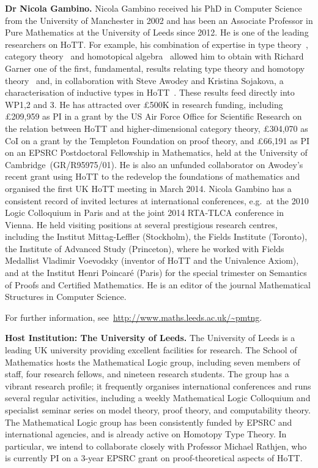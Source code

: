 \documentclass[a4paper,11pt]{article}
\begin{document}
\textbf{Dr Nicola Gambino.} Nicola Gambino received his PhD in
Computer Science from the University of Manchester in 2002 and has
been an Associate Professor in Pure Mathematics at the
University of Leeds since 2012.
He is one of the leading researchers
on HoTT. For example, his combination of expertise in type
theory~\cite{GambinoN:gentti}, category theory~\cite{GambinoN:polfpm}
and homotopical algebra~\cite{GambinoN:homl2c,GambinoN:weilsh} allowed
him to obtain with Richard Garner one of the 
first, fundamental, results relating type theory and homotopy
theory~\cite{GambinoN:idetwfs} and, in collaboration with Steve Awodey
and Kristina Sojakova, a characterisation of inductive types in
HoTT~\cite{awodeyGamSoja:indTypesInHTT}. These results feed directly
into WP1,2 and 3. He has attracted over \pounds500K in research
funding, including \pounds 209,959 as PI in a grant by the US Air
Force Office for Scientific Research on the relation between HoTT and
higher-dimensional category theory, \pounds 304,070 as CoI on a grant
by the Templeton Foundation on proof theory, and \pounds 66,191 as PI
on an EPSRC Postdoctoral Fellowship in Mathematics, held at the
University of Cambridge~(GR/R95975/01). He is also an unfunded
collaborator on Awodey's recent grant using HoTT to the
redevelop the foundations of mathematics and organised the first
UK HoTT meeting in March 2014. Nicola Gambino has a
consistent record of invited lectures at international conferences,
{e.g.}~at the 2010 Logic Colloquium in Paris and at the joint 2014
RTA-TLCA conference in Vienna. He held visiting positions at several
prestigious research centres, including the Institut Mittag-Leffler
(Stockholm), the Fields Institute (Toronto), the Institute of Advanced
Study (Princeton), where he worked with Fields Medallist Vladimir
Voevodsky (inventor of HoTT and the Univalence Axiom), and at the Institut
Henri Poincar\'e (Paris) for the special trimester on Semantics of
Proofs and Certified Mathematics.  He is an editor of the journal
Mathematical Structures in Computer Science.

For further information,  see~\url{http://www.maths.leeds.ac.uk/~pmtng}.

\textbf{Host Institution: The University of Leeds.} The University of
Leeds is a leading UK university providing
excellent facilities for research. The School of Mathematics hosts the
Mathematical Logic group, including seven members of staff, four
research fellows, and nineteen research students. The group has a
vibrant research profile; it frequently organises
international conferences and runs several regular activities,
including a weekly Mathematical Logic Colloquium and specialist
seminar series on model theory, proof theory, and computability
theory. The Mathematical Logic group has been consistently funded by
EPSRC and international agencies, and is already active on Homotopy
Type Theory. In particular, we intend to collaborate closely with
Professor Michael Rathjen, who is currently PI
on a 3-year EPSRC grant on proof-theoretical aspects of HoTT. 
\end{document}

